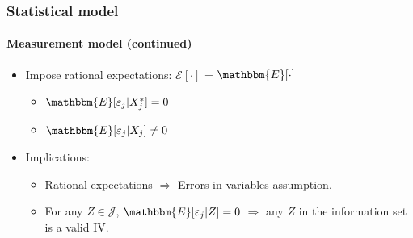 
\begin{frame}
\frametitle{Statistical model} \framesubtitle{Measurement model (continued)}

\begin{itemize}
\item Impose rational expectations: $\mathcal{E}[\cdot]$ = $%
\mathbbm{E}[\cdot]$ 

\begin{itemize}
\item $\mathbbm{E}[\varepsilon_{j}|X^{*}_{j}]=0$ 

\item $\mathbbm{E}[\varepsilon_{j}|X_{j}]\neq0$ 
\end{itemize}

\item Implications: 

\begin{itemize}
\item Rational expectations $\Longrightarrow$ Errors-in-variables
assumption. 

\item For any $Z\in\mathcal{J}$, $\mathbbm{E}[\varepsilon_{j}|Z]=0$ $%
\Longrightarrow$ any $Z$ in the information set is a valid IV. 
\end{itemize}
\end{itemize}
\end{frame}



